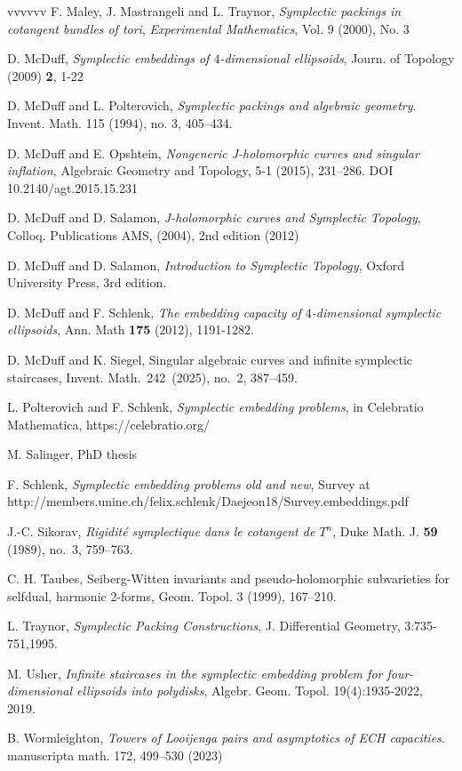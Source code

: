 \documentclass[11pt, reqno]{amsart}
\theoremstyle{remark}
\numberwithin{equation}{subsection}
\numberwithin{figure}{section}
\theoremstyle{customremark}
\begin{document}
\begin{thebibliography}{vvvvvv}
 F. Maley, J. Mastrangeli and L. Traynor, {\em Symplectic packings in cotangent bundles of tori}, {\em Experimental Mathematics}, Vol. 9 (2000), No. 3 


  D. McDuff, {\it Symplectic embeddings of $4$-dimensional ellipsoids},  { Journ. of Topology} (2009) {\bf 2}, 1-22

  D. McDuff and  L. Polterovich, {\it Symplectic packings and algebraic geometry}.  Invent. Math. 115 (1994), no. 3, 405–434.

  D. McDuff  and E. Opshtein, {\it Nongeneric J-holomorphic curves and singular inflation,}      
{ Algebraic Geometry and Topology}, 5-1 (2015), 231--286. DOI 10.2140/agt.2015.15.231

 D. McDuff and  D. Salamon,  {\it J-holomorphic curves and Symplectic Topology}, Colloq. Publications AMS, (2004), 2nd edition (2012)

 D. McDuff and  D. Salamon, {\it Introduction to Symplectic Topology}, Oxford University Press, 3rd edition.

 D. McDuff and F. Schlenk, {\em The embedding capacity of $4$-dimensional symplectic ellipsoids}, 
Ann. Math {\bf 175} (2012), 1191-1282.

 D. McDuff and K. Siegel, Singular algebraic curves and infinite symplectic staircases,
Invent. Math. 242 (2025), no. 2, 387–459.

L. Polterovich and F. Schlenk, {\em Symplectic embedding problems}, in Celebratio Mathematica, https://celebratio.org/

 M. Salinger, PhD thesis

 F. Schlenk, {\em Symplectic embedding problems old and new}, Survey at http://members.unine.ch/felix.schlenk/Daejeon18/Survey.embeddings.pdf

 J.-C. Sikorav,
\emph{Rigidit{\'e} symplectique dans le cotangent de {$T^n$}},
Duke Math. J. \textbf{59} (1989), no.~3, 759--763.

 C. H. Taubes, Seiberg-Witten invariants and pseudo-holomorphic subvarieties for selfdual, harmonic 2-forms, Geom. Topol. 3 (1999), 167–210.

 L. Traynor, {\it Symplectic Packing Constructions}, {J. Differential Geometry}, 3:735-751,1995. 

M. Usher, {\it Infinite staircases in the symplectic embedding problem for four-dimensional ellipsoids into polydisks}, { Algebr. Geom. Topol.} 19(4):1935-2022, 2019.

 B. Wormleighton, {\em Towers of Looijenga pairs and asymptotics of ECH capacities}.  manuscripta math. 172, 499–530 (2023)

\end{thebibliography}
\end{document}

